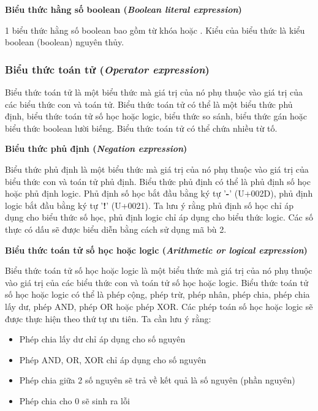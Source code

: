 \noindent\textbf{Biểu thức hằng số boolean (\textit{Boolean literal expression})}

1 biểu thức hằng số boolean bao gồm từ khóa  hoặc . Kiểu của biểu thức là kiểu boolean (boolean) nguyên thủy.

\subsubsection{Biểu thức toán tử (\textit{Operator expression})}

\regexopexpr

Biểu thức toán tử là một biểu thức mà giá trị của nó phụ thuộc vào giá trị của các biểu thức con và toán tử. Biểu thức toán tử có thể là một biểu thức phủ định, biểu thức toán tử số học hoặc logic, biểu thức so sánh, biểu thức gán hoặc biểu thức boolean lười biếng. Biểu thức toán tử có thể chứa nhiều từ tố.

\noindent\textbf{Biểu thức phủ định (\textit{Negation expression})}

\regexneexpr

Biểu thức phủ định là một biểu thức mà giá trị của nó phụ thuộc vào giá trị của biểu thức con và toán tử phủ định. Biểu thức phủ định có thể là phủ định số học hoặc phủ định logic. Phủ định số học bắt đầu bằng ký tự '\textbf{-}' (U+002D), phủ định logic bắt đầu bằng ký tự '\textbf{!}' (U+0021). Ta lưu ý rằng phủ định số học chỉ áp dụng cho biểu thức số học, phủ định logic chỉ áp dụng cho biểu thức logic. Các số thực có dấu sẽ được biểu diễn bằng cách sử dụng mã bù 2.

\noindent\textbf{Biểu thức toán tử số học hoặc logic (\textit{Arithmetic or logical expression})}

\regexarithlogicexpr

Biểu thức toán tử số học hoặc logic là một biểu thức mà giá trị của nó phụ thuộc vào giá trị của các biểu thức con và toán tử số học hoặc logic. Biểu thức toán tử số học hoặc logic có thể là phép cộng, phép trừ, phép nhân, phép chia, phép chia lấy dư, phép AND, phép OR hoặc phép XOR. Các phép toán số học hoặc logic sẽ được thực hiện theo thứ tự ưu tiên. Ta cần lưu ý rằng:

\begin{itemize}
    \item{Phép chia lấy dư chỉ áp dụng cho số nguyên}
    \item{Phép AND, OR, XOR chỉ áp dụng cho số nguyên}
    \item{Phép chia giữa 2 số nguyên sẽ trả về kết quả là số nguyên (phần nguyên)}
    \item{Phép chia cho 0 sẽ sinh ra lỗi}           
\end{itemize}

